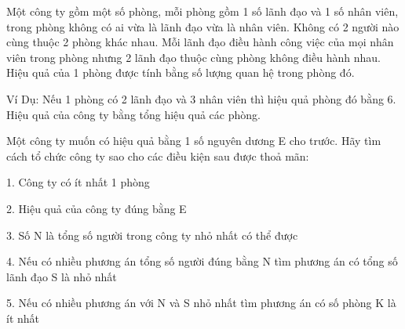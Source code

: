 Một công ty gồm một số phòng, mỗi phòng gồm 1 số lãnh đạo và 1 số nhân viên, trong phòng không có ai vừa là lãnh đạo vừa là nhân viên. Không có 2 người nào cùng thuộc 2 phòng khác nhau. Mỗi lãnh đạo điều hành công việc của mọi nhân viên trong phòng nhưng 2 lãnh đạo thuộc cùng phòng không điều hành nhau. Hiệu quả của 1 phòng được tính bằng số lượng quan hệ trong phòng đó.  

   Ví Dụ: Nếu 1 phòng có 2 lãnh đạo và 3 nhân viên thì hiệu quả phòng đó bằng 6. Hiệu quả của công ty bằng tổng hiệu quả các phòng.  

   Một công ty muốn có hiệu quả bằng 1 số nguyên dương E cho trước. Hãy tìm cách tổ chức công ty sao cho các điều kiện sau được thoả mãn:  

   1. Công ty có ít nhất 1 phòng  

   2. Hiệu quả của công ty đúng bằng E  

   3. Số N là tổng số người trong công ty nhỏ nhất có thể được  

   4. Nếu có nhiều phương án tổng số người đúng bằng N tìm phương án có tổng số lãnh đạo S là nhỏ nhất  

   5. Nếu có nhiều phương án với N và S nhỏ nhất tìm phương án có số phòng K là ít nhất  

\